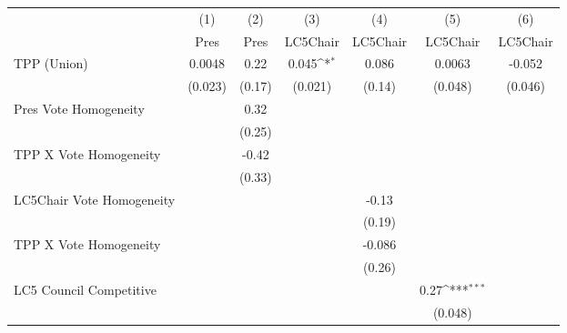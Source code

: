 {
\def\sym#1{\ifmmode^{#1}\else\(^{#1}\)\fi}
\begin{tabular}{l*{6}{c}}
\toprule
                &\multicolumn{1}{c}{(1)}&\multicolumn{1}{c}{(2)}&\multicolumn{1}{c}{(3)}&\multicolumn{1}{c}{(4)}&\multicolumn{1}{c}{(5)}&\multicolumn{1}{c}{(6)}\\
                &\multicolumn{1}{c}{Pres}&\multicolumn{1}{c}{Pres}&\multicolumn{1}{c}{LC5Chair}&\multicolumn{1}{c}{LC5Chair}&\multicolumn{1}{c}{LC5Chair}&\multicolumn{1}{c}{LC5Chair}\\
\midrule
TPP (Union)     &   0.0048         &     0.22         &    0.045\sym{*}  &    0.086         &   0.0063         &   -0.052         \\
                &  (0.023)         &   (0.17)         &  (0.021)         &   (0.14)         &  (0.048)         &  (0.046)         \\
Pres Vote Homogeneity&                  &     0.32         &                  &                  &                  &                  \\
                &                  &   (0.25)         &                  &                  &                  &                  \\
TPP X Vote Homogeneity&                  &    -0.42         &                  &                  &                  &                  \\
                &                  &   (0.33)         &                  &                  &                  &                  \\
LC5Chair Vote Homogeneity&                  &                  &                  &    -0.13         &                  &                  \\
                &                  &                  &                  &   (0.19)         &                  &                  \\
TPP X Vote Homogeneity&                  &                  &                  &   -0.086         &                  &                  \\
                &                  &                  &                  &   (0.26)         &                  &                  \\
LC5 Council Competitive&                  &                  &                  &                  &     0.27\sym{***}&                  \\
                &                  &                  &                  &                  &  (0.048)         &                  \\

\end{tabular}}
